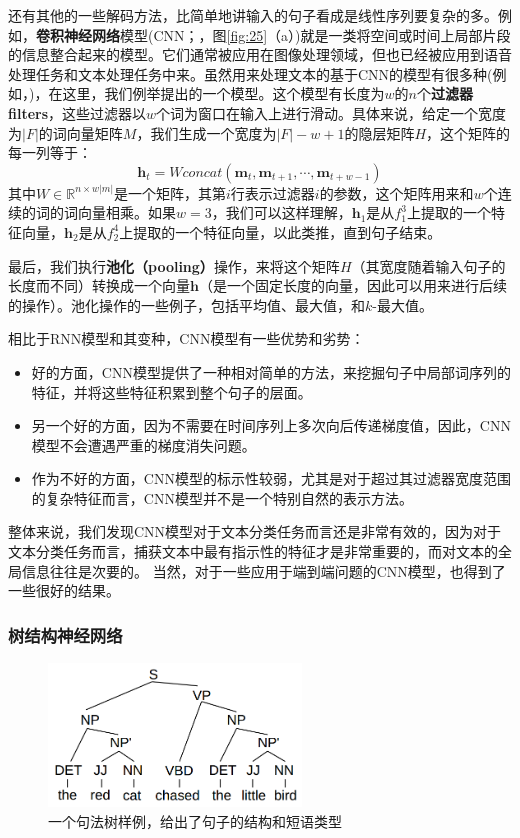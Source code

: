 \documentclass[10pt,a4paper]{ctexart}
\begin{document}
还有其他的一些解码方法，比简单地讲输入的句子看成是线性序列要复杂的多。例如，\textbf{卷积神经网络}模型(CNN；\cite{fukushima1988neocognitron,waibel1989phoneme,lecun1998gradient}，图\ref{fig:25}（a）)就是一类将空间或时间上局部片段的信息整合起来的模型。它们通常被应用在图像处理领域，但也已经被应用到语音处理任务和文本处理任务中来。虽然用来处理文本的基于CNN的模型有很多种(例如，\cite{kalchbrenner2014convolutional,lei2015molding,kalchbrenner2016neural})，在这里，我们例举\cite{kim2014convolutional}提出的一个模型。这个模型有长度为$w$的$n$个\textbf{过滤器filters}，这些过滤器以$w$个词为窗口在输入上进行滑动。具体来说，给定一个宽度为$|F|$的词向量矩阵$M$，我们生成一个宽度为$|F|-w+1$的隐层矩阵$H$，这个矩阵的每一列等于：
\[
 \textbf{h}_t = W concat(\textbf{m}_t,\textbf{m}_{t+1},\cdots,\textbf{m}_{t+w-1})
\]
其中$W \in \mathbb{R}^{n \times w|m|}$是一个矩阵，其第$i$行表示过滤器$i$的参数，这个矩阵用来和$w$个连续的词的词向量相乘。如果$w=3$，我们可以这样理解，$\textbf{h}_1$是从$f_1^3$上提取的一个特征向量，$\textbf{h}_2$是从$f_2^4$上提取的一个特征向量，以此类推，直到句子结束。

最后，我们执行\textbf{池化（pooling）}操作，来将这个矩阵$H$（其宽度随着输入句子的长度而不同）转换成一个向量$\textbf{h}$（是一个固定长度的向量，因此可以用来进行后续的操作）。池化操作的一些例子，包括平均值、最大值，和$k$-最大值\cite{kalchbrenner2014convolutional}。

相比于RNN模型和其变种，CNN模型有一些优势和劣势：
\begin{itemize}
\item 好的方面，CNN模型提供了一种相对简单的方法，来挖掘句子中局部词序列的特征，并将这些特征积累到整个句子的层面。
\item 另一个好的方面，因为不需要在时间序列上多次向后传递梯度值，因此，CNN模型不会遭遇严重的梯度消失问题。
\item 作为不好的方面，CNN模型的标示性较弱，尤其是对于超过其过滤器宽度范围的复杂特征而言，CNN模型并不是一个特别自然的表示方法。
\end{itemize}

整体来说，我们发现CNN模型对于文本分类任务而言还是非常有效的，因为对于文本分类任务而言，捕获文本中最有指示性的特征才是非常重要的，而对文本的全局信息往往是次要的\cite{kim2014convolutional}。
当然，对于一些应用于端到端问题的CNN模型，也得到了一些很好的结果\cite{kalchbrenner2016neural}。

\subsubsection{树结构神经网络}
\begin{figure}[H]
\centering
\includegraphics[width=0.6\textwidth]{fig26.png}
\caption{一个句法树样例，给出了句子的结构和短语类型}
\label{fig:26}
\end{figure}
\end{document}
